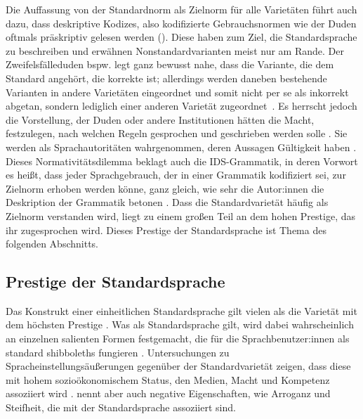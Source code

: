 Die Auffassung von der Standardnorm als Zielnorm für alle Varietäten führt auch dazu, dass deskriptive Kodizes, also kodifizierte Gebrauchsnormen \citep[s.][21]{Gloy1975} wie der Duden oftmals präskriptiv gelesen werden (\cites[s.][236, 238]{Presch1980}[21]{Antos1996}[219--220]{Klein2014}). 
Diese haben zum Ziel, die Standardsprache zu beschreiben und erwähnen Nonstandardvarianten meist nur am Rande. 
Der Zweifelsf{\"a}lleduden bspw. legt ganz bewusst nahe, dass die Variante, die dem Standard angeh{\"o}rt, die korrekte ist; allerdings werden daneben bestehende Varianten in andere Variet{\"a}ten eingeordnet und somit nicht per se als inkorrekt abgetan, sondern lediglich einer anderen Varietät zugeordnet~\citep[s.][215]{Eisenberg2007}. 
Es herrscht jedoch die Vorstellung, der Duden oder andere Institutionen hätten die Macht, festzulegen, nach welchen Regeln gesprochen und geschrieben werden solle \citep[s.][172]{Beuge2017}. 
Sie werden als Sprachautoritäten wahrgenommen, deren Aussagen Gültigkeit haben \citep[s.][222]{Klein2014}.  
Dieses \glqq Normativitätsdilemma\grqq{} \citep[29]{Hennig2009} beklagt auch die IDS-Grammatik, in deren Vorwort es heißt, dass jeder Sprachgebrauch, der in einer Grammatik kodifiziert sei, zur Zielnorm erhoben werden könne, ganz gleich, wie sehr die Autor:innen die Deskription der Grammatik betonen \citep[s.][6]{Zifonun1997}. 
Dass die Standardvarietät häufig als Zielnorm verstanden wird, liegt zu einem großen Teil an dem hohen Prestige, das ihr zugesprochen wird. 
Dieses Prestige der Standardsprache ist Thema des folgenden Abschnitts. 
\subsection{Prestige der Standardsprache}
\label{sec:Prestigevarietaet}
Das Konstrukt einer einheitlichen Standardsprache gilt vielen als die Variet{\"a}t mit dem h{\"o}chsten Prestige \citep[s.][31]{Ammon.2005}. 
Was als Standardsprache gilt, wird dabei wahrscheinlich an einzelnen salienten Formen festgemacht, die für die Sprachbenutzer:innen als {\glqq}standard shibboleths{\grqq} fungieren \citep[s.][142]{Silverstein.2017}.
Untersuchungen zu %
Spracheinstellungsäußerungen %
gegen{\"u}ber der Standardvarietät zeigen, dass diese mit hohem sozio{\"o}konomischem Status, den Medien, Macht und Kompetenz assoziiert wird %
\citep[s.][585]{Giles.1988}. 
\citet[32]{Auer.2013} nennt aber auch negative Eigenschaften, wie Arroganz und Steifheit, die mit der Standardsprache assoziiert sind. 

